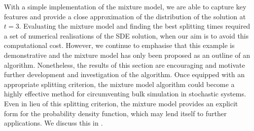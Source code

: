 With a simple implementation of the mixture model, we are able to capture key features and provide a close approximation of the distribution of the solution at \(t = 3\).
Evaluating the mixture model and finding the best splitting times required a set of numerical realisations of the SDE solution, when our aim is to avoid this computational cost.
However, we continue to emphasise that this example is demonstrative and the mixture model has only been proposed as an outline of an algorithm.
Nonetheless, the results of this section are encouraging and motivate further development and investigation of the algorithm.
Once equipped with an appropriate splitting criterion, the mixture model algorithm could become a highly effective method for circumventing bulk simulation in stochastic systems.
Even in lieu of this splitting criterion, the mixture model provides an explicit form for the probability density function, which may lend itself to further applications.
We discuss this in .





